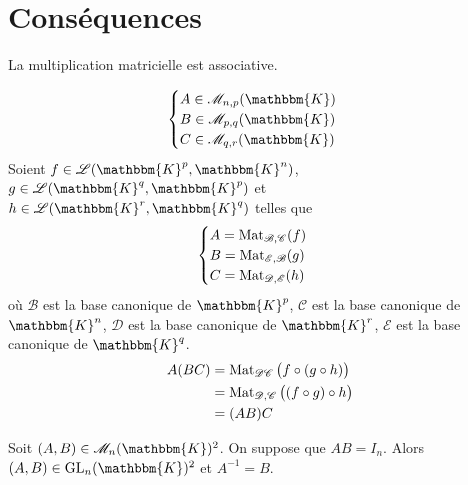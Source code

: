 \part{Conséquences}

\begin{prop}
	La multiplication matricielle est associative.
\end{prop}

\begin{prv}
	\[
		\begin{cases}
			A \in \mathcal{M}_{n,p}(\mathbbm{K})\\
			B \in \mathcal{M}_{p,q}(\mathbbm{K})\\
			C \in \mathcal{M}_{q,r}(\mathbbm{K})
		\end{cases}
	\]
	Soient $f \in \mathcal{L}(\mathbbm{K}^p, \mathbbm{K}^n)$, $g \in \mathcal{L}(\mathbbm{K}^q, \mathbbm{K}^p)$ et $h \in \mathcal{L}(\mathbbm{K}^r, \mathbbm{K}^q)$ telles que \[
		\begin{cases}
			A = \operatorname{Mat}_{\mathcal{B},\mathcal{C}}(f)\\
			B = \operatorname{Mat}_{\mathcal{E}, \mathcal{B}}(g)\\
			C = \operatorname{Mat}_{\mathcal{D},\mathcal{E}}(h)
		\end{cases}
	\] où 
	$\mathcal{B}$ est la base canonique de $\mathbbm{K}^p$,
	$\mathcal{C}$ est la base canonique de $\mathbbm{K}^n$,
	$\mathcal{D}$ est la base canonique de $\mathbbm{K}^r$,
	$\mathcal{E}$ est la base canonique de $\mathbbm{K}^q$.\\
	\begin{align*}
		A(BC) &= \operatorname{Mat}_{\mathcal{D}\mathcal{C}}\big(f \circ (g \circ h)\big)\\
					&= \operatorname{Mat}_{\mathcal{D},\mathcal{C}}\big((f \circ g) \circ h\big)  \\
					&= (AB) C \\
	\end{align*}
\end{prv}

\begin{prop}
	Soit $(A,B) \in \mathcal{M}_n(\mathbbm{K})^2$. On suppose que $AB = I_n$. Alors $(A,B) \in \mathrm{GL}_n(\mathbbm{K})^2$ et $A^{-1} = B$.
\end{prop}

